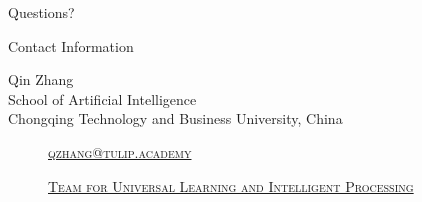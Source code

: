 \documentclass[
 size=14pt,
 paper=smartboard,  %
 mode=present, 		%
 display=slides, 	%
 style=tuliplab,  	%
 pauseslide,
 fleqn,leqno]{powerdot}
\begin{document}
%
\begin{slide}[toc=,bm=]{Questions?}
\begin{center}
\begin{figure}
\end{figure}
\end{center}
\end{slide}


\begin{wideslide}[toc=,bm=]{Contact Information}
\centering
{}
\twocolumn[
lcolwidth=0.35\linewidth,
rcolwidth=0.65\linewidth
]
{
}
{
Qin Zhang\\
School of Artificial Intelligence\\
Chongqing Technology and Business University, China
\begin{description}
 \item[\textcolor{orange}{\faEnvelope}] \href{mailto:qzhang@tulip.academy}
 {\textsc{\footnotesize{qzhang@tulip.academy}}}

 \item[\textcolor{orange}{\faHome}] \href{http://www.tulip.org.au}
 {\textsc{\footnotesize{Team for Universal Learning and Intelligent Processing}}}
\end{description}
}
\end{wideslide}
\end{document}
